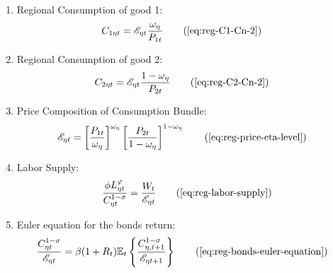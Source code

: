 \documentclass[
thesis.tex
]{subfiles}
\begin{document}
{\begin{itemize}
\begin{enumerate}
		\item Regional Consumption of good 1:
		\begin{align}
			C_{1\eta t} &= \te \frac{\omega_{\eta}}{P_{1t}} \tag{\ref{eq:reg-C1-Cn-2}}
		\end{align}

		\item Regional Consumption of good 2:
		\begin{align}
			C_{2\eta t} &= \te \frac{1 -\omega_{\eta}}{P_{2t}} \tag{\ref{eq:reg-C2-Cn-2}}
		\end{align}

\begin{comment}
	
	\item Regional Consumption:
	\begin{align}
		C_{\eta t} = C_{1\eta t}^{\omega_{\eta}} C_{2\eta t}^{1-\omega_{\eta}} \tag{\ref{eq:reg-consumption-aggregation}}
	\end{align}

	\item Relative Consumption of Regional Goods:
	\begin{align}
		\frac{C_{1\eta t}}{C_{2\eta t}} = \frac{P_{2t}}{P_{1t}} \cdot \frac{\omega_{\eta}}{1 -\omega_{\eta}} \tag{\ref{eq:reg-FOC-C1-C2}}
	\end{align}	
	
\end{comment}

		\item Price Composition of Consumption Bundle:
		\begin{align}
			\te &= \left[ \frac{P_{1t}}{\omega_{\eta}} \right]^{\omega_{\eta}} \left[ \frac{P_{2t}}{1 -\omega_{\eta}} \right]^{1 -\omega_{\eta}} \tag{\ref{eq:reg-price-eta-level}}
		\end{align}

		\item Labor Supply:
		\begin{align}
			\frac{\phi L_{\eta t}^{\varphi}}{C_{\eta t}^{1-\sigma}} = \frac{W_t}{\te} \tag{\ref{eq:reg-labor-supply}}
		\end{align}

		\item Euler equation for the bonds return:
		\begin{align}
			\frac{ C_{\eta t}^{1-\sigma} }{ \te } &= \beta (1 + R_{t}) \E \left\{ \frac{ C_{\eta, t+1}^{1-\sigma} }{ \te[t+1] } \right\} \tag{\ref{eq:reg-bonds-euler-equation}}
		\end{align}
		

\end{enumerate}
\end{itemize}}
\end{document}
